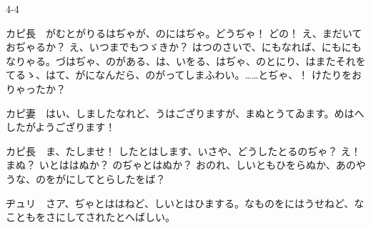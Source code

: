 \documentclass[tate,paper=b6j,jafontsize=9pt]{jlreq}
\begin{document}
\begin{azconvIndented}{4\zw}{-4\zw}

カピ長　がむとがりるはぢゃが、のにはぢゃ。どうぢゃ！ どの！ え、まだいておぢゃるか？ え、いつまでもつゞきか？ はつのさいで、にもなれば、にもにもなりゃる。づはぢゃ、のがある、は、いをる、はぢゃ、のとにり、はまたそれをてるゝ、はて、がになんだら、のがってしまふわい。……とぢゃ、！ けたりをおりゃったか？

カピ妻　はい、しましたなれど、うはござりますが、まぬとうてゐます。めはへしたがようござります！

カピ長　ま、たしませ！ したとはします、いさや、どうしたとるのぢゃ？ え！ まぬ？ いとははぬか？ のぢゃとはぬか？ おのれ、しいともひをらぬか、あのやうな、のをがにしてとらしたをば？

ヂュリ　さア、ぢゃとははねど、しいとはひまする。なものをにはうせねど、なこともをさにしてされたとへばしい。


\end{azconvIndented}
\end{document}
